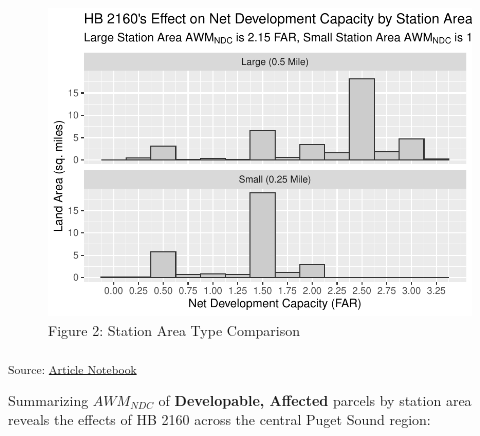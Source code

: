 \documentclass[
]{agujournal2019}
\begin{document}
\begin{figure}[H]

{\centering \includegraphics{index_files/figure-pdf/results-histogram-station-areas-1.pdf}

}

\caption{Figure 2: Station Area Type Comparison}

\end{figure}%

\textsubscript{Source:
\href{https://tiernanmartin.github.io/2024-transit-oriented-development-bill/index.qmd.html}{Article
Notebook}}

Summarizing \(AWM_{NDC}\) of \textbf{Developable, Affected} parcels by
station area reveals the effects of HB 2160 across the central Puget
Sound region:
\end{document}
